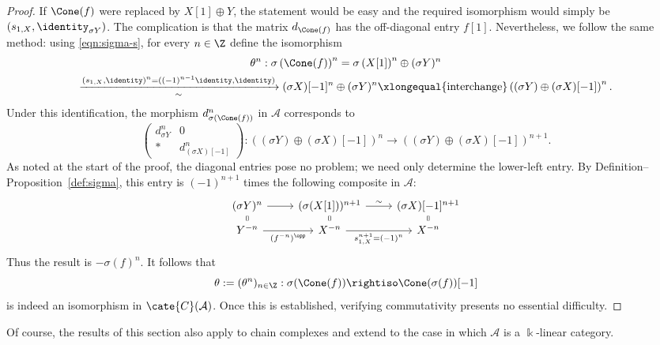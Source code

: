\begin{proof}
	If $\Cone(f)$ were replaced by $X[1]\oplus Y$, the statement would be
	easy and the required isomorphism would simply be
	$(s_{1,X},\identity_{\sigma Y})$. The complication is that the matrix
	$d_{\Cone(f)}$ has the off-diagonal entry $f[1]$. Nevertheless, we follow
	the same method: using \eqref{eqn:sigma-s}, for every $n\in\Z$ define the
	isomorphism
	\begin{multline*}
		\theta^n: \sigma\left(\Cone(f)\right)^n = \sigma\left(X[1]\right)^n \oplus (\sigma Y)^n \\
		\xrightarrow[\sim]{(s_{1,X}, \identity)^n = ((-1)^{n-1} \identity, \identity) } (\sigma X)[-1]^n \oplus (\sigma Y)^n \xlongequal{\text{interchange}} \left( (\sigma Y) \oplus (\sigma X)[-1] \right)^n .
	\end{multline*}
	Under this identification, the morphism $d_{\sigma(\Cone(f))}^n$ in
	$\mathcal{A}$ corresponds to
	\[ \begin{pmatrix}
		d_{\sigma Y}^n & 0 \\
		* & d_{(\sigma X)[-1]}^n
	\end{pmatrix} : \left( (\sigma Y) \oplus (\sigma X)[-1] \right)^n \to \left( (\sigma Y) \oplus (\sigma X)[-1] \right)^{n+1} . \]
	As noted at the start of the proof, the diagonal entries pose no problem;
	we need only determine the lower-left entry. By
	Definition--Proposition~\ref{def:sigma}, this entry is $(-1)^{n+1}$ times
	the following composite in $\mathcal{A}$:
	\[\begin{tikzcd}[row sep=tiny]
		(\sigma Y)^n \arrow[r] & (\sigma(X[1]))^{n+1} \arrow[r, "\sim"] & (\sigma X)[-1]^{n+1} \\
		Y^{-n} \arrow[equal, u] \arrow[r, "{(f^{-n})^{\opp}}"'] & X^{-n} \arrow[equal, u] \arrow[r, "{s_{1, X}^{n+1} = (-1)^n}"'] & X^{-n} \arrow[equal, u]
	\end{tikzcd}\]
	Thus the result is $-\sigma(f)^n$. It follows that
	\[ \theta := (\theta^n)_{n \in \Z}: \sigma(\Cone(f)) \rightiso \Cone(\sigma(f))[-1] \]
	is indeed an isomorphism in $\cate{C}(\mathcal{A})$. Once this is
	established, verifying commutativity presents no essential difficulty.
\end{proof}

Of course, the results of this section also apply to chain complexes and
extend to the case in which $\mathcal{A}$ is a $\Bbbk$-linear category.
